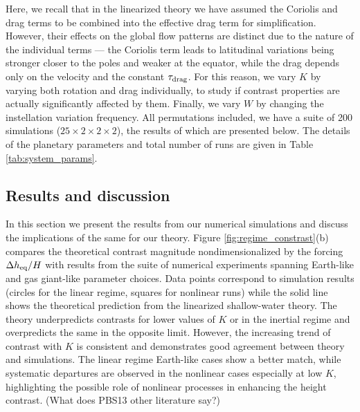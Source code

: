 \documentclass[trackchanges,twocolumn]{aastex7}
\begin{document}
Here, we recall that in the linearized theory we have assumed the Coriolis and drag terms to be combined into the effective drag term for simplification. However, their effects on the global flow patterns are distinct due to the nature of the individual terms --- the Coriolis term leads to latitudinal variations being stronger closer to the poles and weaker at the equator, while the drag depends only on the velocity and the constant $\tau_{\rm drag}$. For this reason, we vary $K$ by varying both rotation and drag individually, to study if contrast properties are actually significantly affected by them. Finally, we vary $W$ by changing the instellation variation frequency. All permutations included, we have a suite of 200 simulations ($25 \times 2 \times 2 \times 2$), the results of which are presented below. The details of the planetary parameters and total number of runs are given in Table \ref{tab:system_params}.

\subsection{Results and discussion}


In this section we present the results from our numerical simulations and discuss the implications of the same for our theory. Figure \ref{fig:regime_constrast}(b) compares the theoretical contrast magnitude nondimensionalized by the forcing $\Delta h_{\rm eq}/H$ with results from the suite of numerical experiments spanning Earth-like and gas giant-like parameter choices. Data points correspond to simulation results (circles for the linear regime, squares for nonlinear runs) while the solid line shows the theoretical prediction from the linearized shallow-water theory. The theory underpredicts contrasts for lower values of $K$ or in the inertial regime and overpredicts the same in the opposite limit. However, the increasing trend of contrast with $K$ is consistent and demonstrates good agreement between theory and simulations. The linear regime Earth-like cases show a better match, while systematic departures are observed in the nonlinear cases especially at low $K$, highlighting the possible role of nonlinear processes in enhancing the height contrast. {\color{red} (What does PBS13 other literature say?)}
\end{document}
